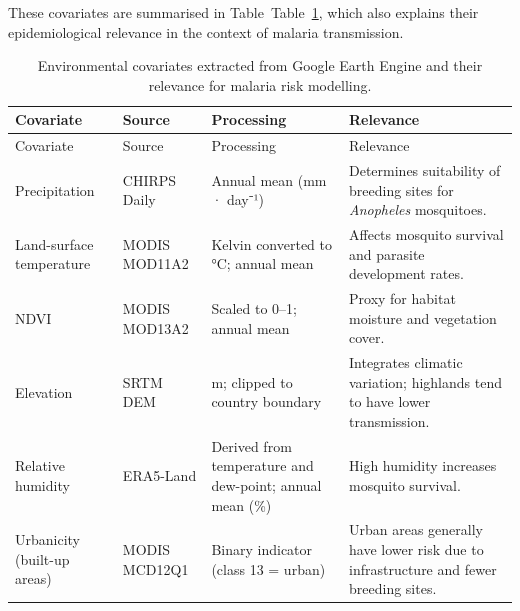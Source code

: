 \documentclass[
  letterpaper,
]{krantz}
\begin{document}
These covariates are summarised in Table~Table~\ref{tbl-covariates},
which also explains their epidemiological relevance in the context of
malaria transmission.

\begin{longtable}[]{@{}
  >{\raggedright\arraybackslash}p{}
  >{\raggedright\arraybackslash}p{}
  >{\raggedright\arraybackslash}p{}
  >{\raggedright\arraybackslash}p{}@{}}
\caption{Environmental covariates extracted from Google Earth Engine and
their relevance for malaria risk
modelling.}\label{tbl-covariates}\tabularnewline
\toprule\noalign{}
\begin{minipage}[b]{\linewidth}\raggedright
Covariate
\end{minipage} & \begin{minipage}[b]{\linewidth}\raggedright
Source
\end{minipage} & \begin{minipage}[b]{\linewidth}\raggedright
Processing
\end{minipage} & \begin{minipage}[b]{\linewidth}\raggedright
Relevance
\end{minipage} \\
\midrule\noalign{}
\endfirsthead
\toprule\noalign{}
\begin{minipage}[b]{\linewidth}\raggedright
Covariate
\end{minipage} & \begin{minipage}[b]{\linewidth}\raggedright
Source
\end{minipage} & \begin{minipage}[b]{\linewidth}\raggedright
Processing
\end{minipage} & \begin{minipage}[b]{\linewidth}\raggedright
Relevance
\end{minipage} \\
\midrule\noalign{}
\endhead
\bottomrule\noalign{}
\endlastfoot
Precipitation & CHIRPS Daily & Annual mean (mm · day⁻¹) & Determines
suitability of breeding sites for \emph{Anopheles} mosquitoes. \\
Land-surface temperature & MODIS MOD11A2 & Kelvin converted to °C;
annual mean & Affects mosquito survival and parasite development
rates. \\
NDVI & MODIS MOD13A2 & Scaled to 0--1; annual mean & Proxy for habitat
moisture and vegetation cover. \\
Elevation & SRTM DEM & 90 m; clipped to country boundary & Integrates
climatic variation; highlands tend to have lower transmission. \\
Relative humidity & ERA5-Land & Derived from temperature and dew-point;
annual mean (\%) & High humidity increases mosquito survival. \\
Urbanicity (built-up areas) & MODIS MCD12Q1 & Binary indicator (class 13
= urban) & Urban areas generally have lower risk due to infrastructure
and fewer breeding sites. \\
\end{longtable}
\end{document}
